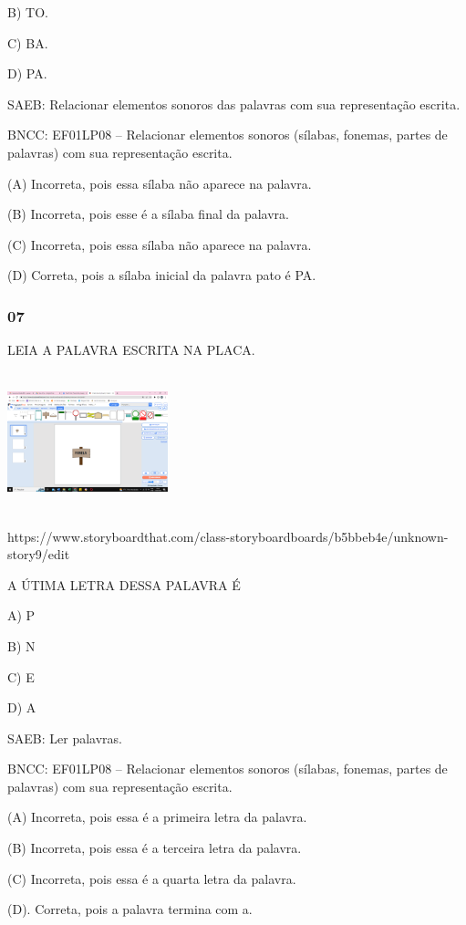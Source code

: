 B) TO.

C) BA.

D) PA.

SAEB: Relacionar elementos sonoros das palavras com sua
representação escrita.

BNCC: EF01LP08 -- Relacionar elementos sonoros (sílabas, fonemas,
partes de palavras) com sua representação escrita.

\protect\hypertarget{_heading=h.19c6y18}{}{}(A) Incorreta, pois
essa sílaba não aparece na palavra.

(B) Incorreta, pois esse é a sílaba final da palavra.

(C) Incorreta, pois essa sílaba não aparece na palavra.

(D) Correta, pois a sílaba inicial da palavra pato é PA.

\subsubsection{07}\label{section-47}

LEIA A PALAVRA ESCRITA NA PLACA.

\includegraphics[width=1.83704in,height=1.58560in]{media/image216.png}

https://www.storyboardthat.com/class-storyboardboards/b5bbeb4e/unknown-story9/edit

A ÚTIMA LETRA DESSA PALAVRA É

A) P

B) N

C) E

D) A

SAEB: Ler palavras.

BNCC: EF01LP08 -- Relacionar elementos sonoros (sílabas, fonemas,
partes de palavras) com sua representação escrita.

(A) Incorreta, pois essa é a primeira letra da palavra.

(B) Incorreta, pois essa é a terceira letra da palavra.

(C) Incorreta, pois essa é a quarta letra da palavra.

(D). Correta, pois a palavra termina com a.


